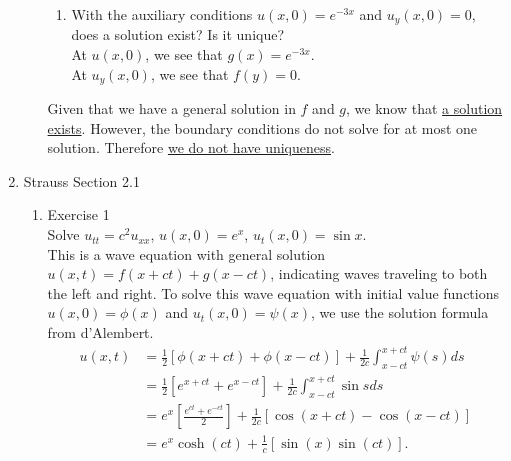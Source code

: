 \documentclass[12pt]{article}%
\begin{document}
\begin{enumerate}
\begin{enumerate}
\begin{enumerate}
            
            \item With the auxiliary conditions $u\left(x,0\right) = e^{-3x}$ and $u_y\left(x,0\right) = 0$, does a solution exist? Is it unique? \smallskip \\
            At $u\left(x,0\right)$, we see that \underline{$g\left(x\right) = e^{-3x}.$} \\
            At $u_y\left(x,0\right)$, we see that \underline{$f\left(y\right) = 0.$} \\            
        \end{enumerate}
        Given that we have a general solution in $f$ and $g$, we know that \underline{a solution exists}.  However, the boundary conditions do not solve for at most one solution.  Therefore \underline{we do not have uniqueness}.
    \end{enumerate}

    \pagebreak
    
    \item Strauss Section 2.1 \smallskip
    \begin{enumerate}
        \item Exercise 1 \smallskip \\
        Solve $u_{tt} = c^2u_{xx}$, $u\left(x,0\right) = e^x$, $u_t\left(x,0\right) = \sin{x}$. \smallskip \\

        This is a wave equation with general solution $u\left(x,t\right) = f\left(x+ct\right) + g\left(x-ct\right)$, indicating waves traveling to both the left and right.  To solve this wave equation with initial value functions $u\left(x,0\right)=\phi\left(x\right)$ and $u_t\left(x,0\right)=\psi\left(x\right)$, we use the solution formula from d'Alembert.
        \begin{align*}
            u\left(x,t\right) &= \frac{1}{2}\left[\phi\left(x+ct\right) + \phi\left(x-ct\right)\right] + \frac{1}{2c}\int_{x-ct}^{x+ct}\psi\left(s\right)ds \\
            &= \frac{1}{2}\left[e^{x+ct} + e^{x-ct}\right] + \frac{1}{2c}\int_{x-ct}^{x+ct}\sin{s}ds \\
            &= e^{x}\left[\frac{e^{ct} + e^{-ct}}{2}\right] + 
                \frac{1}{2c}\left[\cos{\left(x+ct\right)} -\cos{\left(x-ct\right)}\right] \\
            &= \boxed{e^{x}\cosh{\left(ct\right)} + 
                \frac{1}{c}\left[\sin{\left(x\right)}\sin{\left(ct\right)}\right]}. \\
        \end{align*}
        

\end{enumerate}
\end{enumerate}
\end{document}
